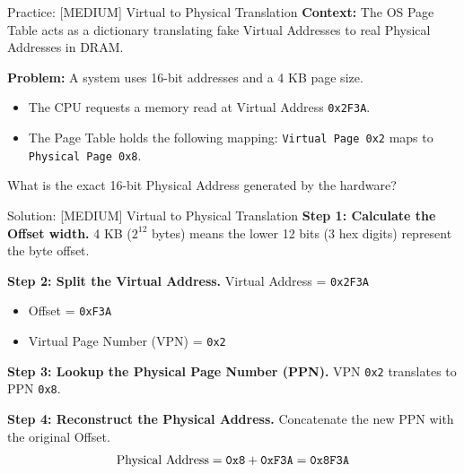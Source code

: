 \documentclass[aspectratio=169]{beamer}
\begin{document}
\begin{frame}{Practice: [MEDIUM] Virtual to Physical Translation}
\textbf{Context:} The OS Page Table acts as a dictionary translating fake Virtual Addresses to real Physical Addresses in DRAM.

\vspace{0.5cm}
\textbf{Problem:} 
A system uses 16-bit addresses and a 4 KB page size. 
\begin{itemize}
    \item The CPU requests a memory read at Virtual Address \texttt{0x2F3A}. 
    \item The Page Table holds the following mapping: \texttt{Virtual Page 0x2} maps to \texttt{Physical Page 0x8}. 
\end{itemize}

\vspace{0.5cm}
What is the exact 16-bit Physical Address generated by the hardware?
\end{frame}

\begin{frame}{Solution: [MEDIUM] Virtual to Physical Translation}
\textbf{Step 1: Calculate the Offset width.}
4 KB ($2^{12}$ bytes) means the lower 12 bits (3 hex digits) represent the byte offset.

\vspace{0.3cm}
\textbf{Step 2: Split the Virtual Address.}
Virtual Address = \texttt{0x2F3A}
\begin{itemize}
    \item Offset = \texttt{0xF3A}
    \item Virtual Page Number (VPN) = \texttt{0x2}
\end{itemize}

\vspace{0.3cm}
\textbf{Step 3: Lookup the Physical Page Number (PPN).}
VPN \texttt{0x2} translates to PPN \texttt{0x8}.

\vspace{0.3cm}
\textbf{Step 4: Reconstruct the Physical Address.}
Concatenate the new PPN with the original Offset.
\[ \text{Physical Address} = \text{\texttt{0x8}} + \text{\texttt{0xF3A}} = \mathbf{\text{\texttt{0x8F3A}}} \]
\end{frame}
\end{document}
